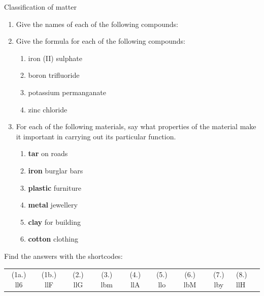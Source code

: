 \begin{eocexercises}{Classification of matter }
{\begin{enumerate}[noitemsep, label=\textbf{\arabic*}. ]
\begin{enumerate}[noitemsep, label=\textbf{\alph*}. ]
\end{enumerate}
\label{m38706*uid153}\item Give the names of each of the following compounds:
\label{m38706*id68358}\begin{enumerate}[noitemsep, label=\textbf{\alph*}. ] 
            \label{m38706*uid154}\item $\text{NaBr}$
\label{m38706*uid155}\item ${\text{Ba}(\text{NO}}}_{2})_2$
\label{m38706*uid156}\item ${\text{SO}}_{2}$ 
\item $\text{H}_{2}\text{SO}_{4}$
\end{enumerate}
\item Give the formula for each of the following compounds:
\begin{enumerate}[noitemsep, label=\textbf{\alph*}.]
 \item iron (II) sulphate
\item boron trifluoride
\item potassium permanganate
\item zinc chloride
\end{enumerate}

\label{m38706*uid157}\item For each of the following materials, say what properties of the material make it important in carrying out its particular function.
\label{m38706*id68436}\begin{enumerate}[noitemsep, label=\textbf{\alph*}. ] 
            \label{m38706*uid158}\item \textbf{tar} on roads
\label{m38706*uid159}\item \textbf{iron} burglar bars
\label{m38706*uid160}\item \textbf{plastic} furniture
\label{m38706*uid161}\item \textbf{metal} jewellery
\label{m38706*uid162}\item \textbf{clay} for building
\label{m38706*uid163}\item \textbf{cotton} clothing
\end{enumerate}
\end{enumerate}
\practiceinfo
  \label{m38706**end}
  \label{09a7a4809656be0b739ee130746cd803**end}
\par {} Find the answers with the shortcodes:
 \par \begin{tabular}[h]{cccccccc}
 (1a.) ll6 & (1b.) llF &  (2.) llG  &  (3.) lbm  &  (4.) llA  &  (5.) llo  &  (6.) lbM  &  (7.) lby  &  (8.) llH  & \end{tabular}}
\end{eocexercises}
